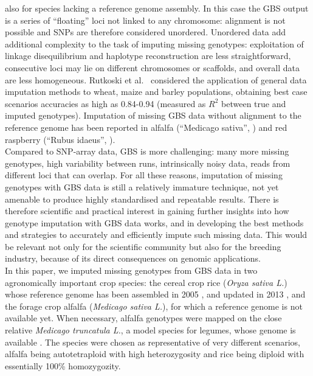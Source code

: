 also for species lacking a reference genome assembly. In this case the 
GBS output is a series of ``floating'' loci not linked to any chromosome:
alignment is not possible and SNPs are therefore considered unordered. Unordered 
data add additional complexity to the task of imputing missing genotypes: 
exploitation of linkage disequilibrium and haplotype reconstruction 
are less straightforward, consecutive loci may lie on different chromosomes
or scaffolds, and overall data are less homogeneous. Rutkoski et al.~\cite{rutkoski_imputation_2013}
considered the application of general data imputation methods 
to wheat, maize and barley populations, obtaining best case scenarios accuracies 
as high as 0.84-0.94 (measured as $R^{2}$ between true and imputed genotypes). Imputation of missing GBS data without alignment to the reference genome has been reported in alfalfa (``Medicago sativa'', \cite{Rocher_validation_2015}) and red raspberry (``Rubus idaeus'', \cite{ward_saturated_2013}).\\
Compared to SNP-array data, GBS is more challenging: many more 
missing genotypes, high variability between runs, intrinsically noisy data, 
reads from different loci that can overlap. For all these reasons, imputation 
of missing genotypes with GBS data is still a relatively immature technique, 
not yet amenable to produce highly standardised and repeatable results. 
There is therefore scientific and practical interest in gaining further 
insights into how genotype imputation with GBS data works, and in 
developing the best methods and strategies to accurately and efficiently 
impute such missing data. This would be relevant not only for the scientific 
community but also for the breeding industry, because of its direct 
consequences on genomic applications.\\
In this paper, we imputed missing genotypes from GBS data in two agronomically
important crop species:
the cereal crop rice (\emph{Oryza sativa L.}) whose reference genome has been 
assembled in 2005 \cite{international_rice_genome_sequencing_project_map-based_2005}, and updated in 2013 \cite{kawahara_improvement_2013},
and
the forage crop alfalfa (\emph{Medicago sativa L.}), for 
which a reference genome is not available yet. When necessary, alfalfa genotypes
were mapped on the close relative \emph{Medicago truncatula L.}, a model species
for legumes, whose genome is available \cite{young_medicago_2011}.
The species were chosen 
as representative of very different scenarios, alfalfa being autotetraploid
with high heterozygosity and rice being diploid with essentially 100\% homozygozity.
